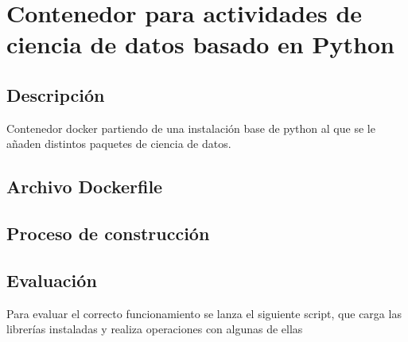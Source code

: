 \section{Contenedor para actividades de ciencia de datos basado en Python}

\subsection{Descripción}

Contenedor docker partiendo de una instalación base de python al que se le añaden distintos paquetes de ciencia de datos.

\subsection{Archivo Dockerfile}

\subsection{Proceso de construcción}




\subsection{Evaluación}

Para evaluar el correcto funcionamiento se lanza el siguiente script, que carga las librerías instaladas y realiza operaciones con algunas de ellas